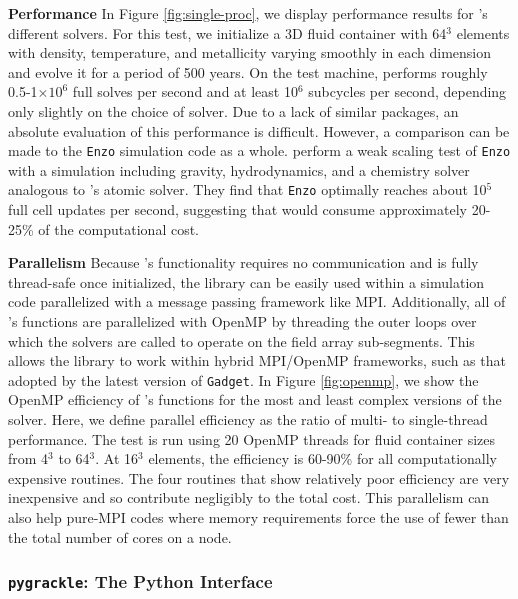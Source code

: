\noindent
{\bf Performance}
In Figure \ref{fig:single-proc}, we
display performance results for \grackle{}'s different solvers.  For
this test, we initialize a 3D fluid container with 64$^{3}$ elements
with density, temperature, and metallicity varying smoothly in each
dimension and evolve it for a period of 500 years.  On the test
machine, \grackle{} performs
roughly 0.5-1$\times10^{6}$ full solves per second and at least
10$^{6}$ subcycles per second, depending only slightly on the choice
of solver.  Due to a lack of similar packages, an absolute evaluation
of this performance is difficult.  However, a comparison can be made
to the \texttt{Enzo} simulation code as a whole.
\citet{2014ApJS..211...19B} perform a weak scaling test of
\texttt{Enzo} with a simulation including gravity,
hydrodynamics, and a chemistry solver analogous to \grackle{}'s atomic
solver.  They find that \texttt{Enzo} optimally reaches about 10$^{5}$
full cell updates per second, suggesting that \grackle{} would consume
approximately 20-25\% of the computational cost.

\noindent
{\bf Parallelism}
Because \grackle{}'s functionality requires no communication and is
fully thread-safe once initialized, the library can be easily used
within a simulation code parallelized with a message passing framework
like MPI.  Additionally, all of \grackle{}'s functions are
parallelized with OpenMP by threading the outer loops over which the
solvers are called to operate on the field array sub-segments.  This
allows the library to work within hybrid MPI/OpenMP frameworks, such
as that adopted by the latest version of \texttt{Gadget}.
In Figure \ref{fig:openmp}, we show the OpenMP efficiency of
\grackle{}'s functions for the most and least complex versions
of the solver.  Here, we define parallel efficiency as the ratio of
multi- to single-thread performance.  The test is run using 20 OpenMP
threads for fluid container sizes from 4$^{3}$ to
64$^{3}$.  At 16$^{3}$ elements, the efficiency is 60-90\%
for all computationally expensive routines.  The four routines that
show relatively poor efficiency are very inexpensive and so contribute negligibly to
the total cost.  This parallelism can also help pure-MPI codes
where memory requirements force the use of fewer than the total number
of cores on a node.

\subsubsection{\texttt{pygrackle}: The Python Interface}

